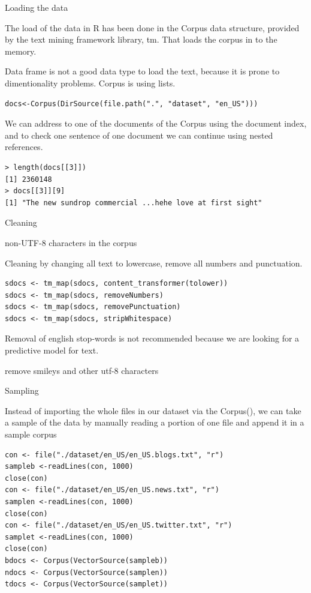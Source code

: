 \documentclass{article}
\begin{document}
Loading the data

The load of the data in R has been done in the Corpus data structure, provided by the text mining framework library, tm. That loads the corpus in to the memory.

Data frame is not a good data type to load the text, because it is prone to dimentionality problems. Corpus is using lists.

\begin{lstlisting}
docs<-Corpus(DirSource(file.path(".", "dataset", "en_US")))
\end{lstlisting}

We can address to one of the documents of the Corpus using the document index, and to check one sentence of one document we can continue using nested references.

\begin{lstlisting}
> length(docs[[3]])
[1] 2360148
> docs[[3]][9]
[1] "The new sundrop commercial ...hehe love at first sight"
\end{lstlisting}


Cleaning

non-UTF-8 characters in the corpus

Cleaning by changing all text to lowercase, remove all numbers and punctuation. 

\begin{lstlisting}
sdocs <- tm_map(sdocs, content_transformer(tolower))
sdocs <- tm_map(sdocs, removeNumbers)
sdocs <- tm_map(sdocs, removePunctuation)
sdocs <- tm_map(sdocs, stripWhitespace)
\end{lstlisting}

Removal of english stop-words is not recommended because we are looking for a predictive model for text.

remove smileys and other utf-8 characters



Sampling

Instead of importing the whole files in our dataset via the Corpus(), we can take a sample of the data by manually reading a portion of one file and append it in a sample corpus 

\begin{lstlisting}
con <- file("./dataset/en_US/en_US.blogs.txt", "r")
sampleb <-readLines(con, 1000)
close(con)
con <- file("./dataset/en_US/en_US.news.txt", "r")
samplen <-readLines(con, 1000)
close(con)
con <- file("./dataset/en_US/en_US.twitter.txt", "r")
samplet <-readLines(con, 1000)
close(con)
bdocs <- Corpus(VectorSource(sampleb))
ndocs <- Corpus(VectorSource(samplen))
tdocs <- Corpus(VectorSource(samplet))
\end{lstlisting}
\end{document}

